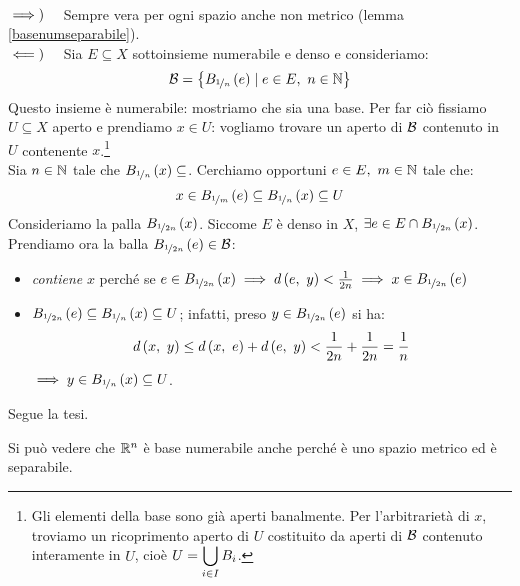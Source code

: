 \begin{demonstration}~{}\\
$\implies)\quad$ Sempre vera per ogni spazio anche non metrico (lemma \ref{basenumseparabile}).\\
$\impliedby)\quad$ Sia $E\subseteq X$ sottoinsieme numerabile e denso e consideriamo:
\begin{equation*}
	\mathcal{B}=\left\{B_{\nicefrac{1}{n}}\left(e\right)\mid e\in E,\ n\in \mathbb{N}\right\}
\end{equation*}
Questo insieme è numerabile: mostriamo che sia una base. Per far ciò fissiamo $U\subseteq X$ aperto e prendiamo $x\in U$: vogliamo trovare un aperto di $\mathcal{B}$ contenuto in $U$ contenente $x$.\footnote{Gli elementi della base sono già aperti banalmente. Per l'arbitrarietà di $x$, troviamo un ricoprimento aperto di $U$ costituito da aperti di $\mathcal{B}$ contenuto interamente in $U$, cioè $\displaystyle U=\mathop{{\bigcup}}\displaylimits_{i\in I}B_i$.}\\
Sia $n\in\mathbb{N}$ tale che $B_{\nicefrac{1}{n}}\left(x\right)\subseteq$. Cerchiamo opportuni $e\in E,\ m\in\naturalset$ tale che:
\begin{equation*}
x\in B_{\nicefrac{1}{m}}\left(e\right)\subseteq B_{\nicefrac{1}{n}}\left(x\right)\subseteq U
\end{equation*}
Consideriamo la palla $B_{\nicefrac{1}{2n}}\left(x\right)$. Siccome $E$ è denso in $X$, $\exists e\in E\cap B_{\nicefrac{1}{2n}}\left(x\right)$.\\
Prendiamo ora la balla $B_{\nicefrac{1}{2n}}\left(e\right)\in\mathcal{B}$:
\begin{itemize}
	\item \textit{contiene} $x$ perché se $e\in B_{\nicefrac{1}{2n}}\left(x\right)\implies d\left(e,\ y\right)<\frac{1}{2n}\implies x\in B_{\nicefrac{1}{2n}}\left(e\right)$
	\item $B_{\nicefrac{1}{2n}}\left(e\right)\subseteq B_{\nicefrac{1}{n}}\left(x\right)\subseteq U$; infatti, preso $y\in B_{\nicefrac{1}{2n}}\left(e\right)$ si ha:
	\begin{equation*}
		d\left(x,\ y\right)\leq d\left(x,\ e\right)+d\left(e,\ y\right)<\frac{1}{2n}+\frac{1}{2n}=\frac{1}{n}
	\end{equation*}
$\implies y\in B_{\nicefrac{1}{n}}\left(x\right) \subseteq U$.
\end{itemize}
Segue la tesi.
\end{demonstration}
\begin{example}
	Si può vedere che $\mathbb{R}^n$ è base numerabile anche perché è uno spazio metrico ed è separabile.
\end{example}
